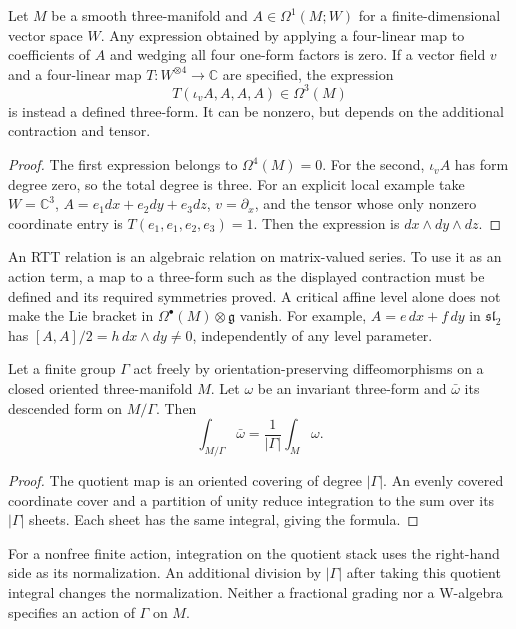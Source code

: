 \begin{proposition}
\label{prop:cbc26-quartic-degree}
Let $M$ be a smooth three-manifold and $A\in\Omega^1(M;W)$ for a finite-dimensional vector space $W$.
Any expression obtained by applying a four-linear map to coefficients of $A$ and wedging all four one-form factors is zero.
If a vector field $v$ and a four-linear map $T:W^{\otimes4}\to\mathbb C$ are specified, the expression
\[
 T(\iota_vA,A,A,A)\in\Omega^3(M)
\]
is instead a defined three-form.
It can be nonzero, but depends on the additional contraction and tensor.
\end{proposition}
\begin{proof}
The first expression belongs to $\Omega^4(M)=0$.
For the second, $\iota_v A$ has form degree zero, so the total degree is three.
For an explicit local example take $W=\mathbb C^3$, $A=e_1dx+e_2dy+e_3dz$, $v=\partial_x$, and the tensor whose only nonzero coordinate entry is $T(e_1,e_1,e_2,e_3)=1$.
Then the expression is $dx\wedge dy\wedge dz$.
\end{proof}

An RTT relation is an algebraic relation on matrix-valued series.
To use it as an action term, a map to a three-form such as the displayed contraction must be defined and its required symmetries proved.
A critical affine level alone does not make the Lie bracket in $\Omega^\bullet(M)\otimes\mathfrak g$ vanish.
For example, $A=e\,dx+f\,dy$ in $\mathfrak{sl}_2$ has $[A,A]/2=h\,dx\wedge dy\ne0$, independently of any level parameter.

\begin{proposition}
\label{prop:cbc26-quotient-integral}
Let a finite group $\Gamma$ act freely by orientation-preserving diffeomorphisms on a closed oriented three-manifold $M$.
Let $\omega$ be an invariant three-form and $\bar\omega$ its descended form on $M/\Gamma$.
Then
\[
 \int_{M/\Gamma}\bar\omega=\frac1{|\Gamma|}\int_M\omega.
\]
\end{proposition}
\begin{proof}
The quotient map is an oriented covering of degree $|\Gamma|$.
An evenly covered coordinate cover and a partition of unity reduce integration to the sum over its $|\Gamma|$ sheets.
Each sheet has the same integral, giving the formula.
\end{proof}

For a nonfree finite action, integration on the quotient stack uses the right-hand side as its normalization.
An additional division by $|\Gamma|$ after taking this quotient integral changes the normalization.
Neither a fractional grading nor a W-algebra specifies an action of $\Gamma$ on $M$.

